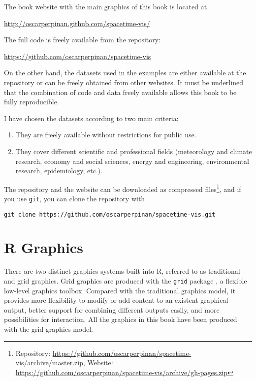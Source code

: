 The book website with the main graphics of this book is located at

\begin{center}
  \url{http://oscarperpinan.github.com/spacetime-vis/}
\end{center}

The full code is freely available from the repository:

\begin{center}
  \url{https://github.com/oscarperpinan/spacetime-vis}
\end{center}

On the other hand, the datasets used in the examples are either
available at the repository or can be freely obtained from other
websites. It must be underlined that the combination of code and data
freely available allows this book to be fully reproducible.

I have chosen the datasets according to two main criteria:
\begin{enumerate}
\item They are freely available without restrictions for public use.
\item They cover different scientific and professional fields
  (meteorology and climate research, economy and social sciences,
  energy and engineering, environmental research, epidemiology, etc.).
\end{enumerate}

The repository and the website can be downloaded as compressed
files\footnote{Repository:
  \url{https://github.com/oscarperpinan/spacetime-vis/archive/master.zip},
  Website:
  \url{https://github.com/oscarperpinan/spacetime-vis/archive/gh-pages.zip}},
and if you use \texttt{git}, you can clone the repository with

\lstset{language=bash,numbers=none}
\begin{lstlisting}
git clone https://github.com/oscarperpinan/spacetime-vis.git
\end{lstlisting}



\section{\textsf{R} Graphics}
\label{sec:r-graphics}

There are two distinct graphics systems built into \textsf{R},
referred to as traditional and grid graphics. Grid graphics are
produced with the \texttt{grid} package \cite{Murrell2011}, a flexible
low-level graphics toolbox. Compared with the traditional graphics
model, it provides more flexibility to modify or add content to an
existent graphical output, better support for combining different
outputs easily, and more possibilities for interaction. All the
graphics in this book have been produced with the grid graphics model.

